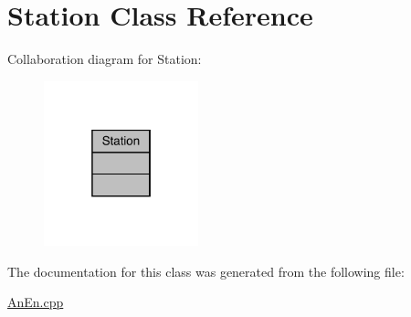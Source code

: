 \hypertarget{class_station}{}\section{Station Class Reference}
\label{class_station}


Collaboration diagram for Station\+:
\nopagebreak
\begin{figure}[H]
\begin{center}
\leavevmode
\includegraphics[width=127pt]{class_station__coll__graph}
\end{center}
\end{figure}


The documentation for this class was generated from the following file\+:\begin{DoxyCompactItemize}
\item 
\mbox{\hyperlink{_an_en_8cpp}{An\+En.\+cpp}}\end{DoxyCompactItemize}

